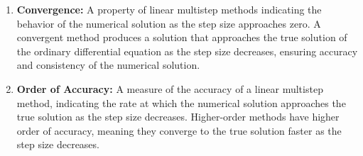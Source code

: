\begin{enumerate}
    \item \textbf{Convergence:} A property of linear multistep methods indicating the behavior of the numerical solution as the step size approaches zero. A convergent method produces a solution that approaches the true solution of the ordinary differential equation as the step size decreases, ensuring accuracy and consistency of the numerical solution.
    
    \item \textbf{Order of Accuracy:} A measure of the accuracy of a linear multistep method, indicating the rate at which the numerical solution approaches the true solution as the step size decreases. Higher-order methods have higher order of accuracy, meaning they converge to the true solution faster as the step size decreases.
\end{enumerate}